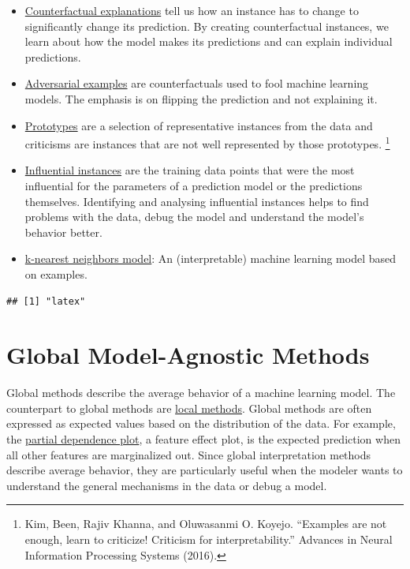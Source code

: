 \documentclass[
  11pt,
]{scrbook}
\providecommand{\tightlist}{%
  \setlength{\itemsep}{0pt}\setlength{\parskip}{0pt}}
\begin{document}
\begin{itemize}
\tightlist
\item
  \protect\hyperlink{counterfactual}{Counterfactual explanations} tell us how an instance has to change to significantly change its prediction.
  By creating counterfactual instances, we learn about how the model makes its predictions and can explain individual predictions.
\item
  \protect\hyperlink{adversarial}{Adversarial examples} are counterfactuals used to fool machine learning models.
  The emphasis is on flipping the prediction and not explaining it.
\item
  \protect\hyperlink{proto}{Prototypes} are a selection of representative instances from the data and criticisms are instances that are not well represented by those prototypes. \footnote{Kim, Been, Rajiv Khanna, and Oluwasanmi O. Koyejo. ``Examples are not enough, learn to criticize! Criticism for interpretability.'' Advances in Neural Information Processing Systems (2016).}
\item
  \protect\hyperlink{influential}{Influential instances} are the training data points that were the most influential for the parameters of a prediction model or the predictions themselves.
  Identifying and analysing influential instances helps to find problems with the data, debug the model and understand the model's behavior better.
\item
  \protect\hyperlink{other-interpretable}{k-nearest neighbors model}: An (interpretable) machine learning model based on examples.
\end{itemize}

\begin{verbatim}
## [1] "latex"
\end{verbatim}

\hypertarget{global-methods}{%
\chapter{Global Model-Agnostic Methods}\label{global-methods}}

Global methods describe the average behavior of a machine learning model.
The counterpart to global methods are \protect\hyperlink{local-methods}{local methods}.
Global methods are often expressed as expected values based on the distribution of the data.
For example, the \protect\hyperlink{pdp}{partial dependence plot}, a feature effect plot, is the expected prediction when all other features are marginalized out.
Since global interpretation methods describe average behavior, they are particularly useful when the modeler wants to understand the general mechanisms in the data or debug a model.
\end{document}
